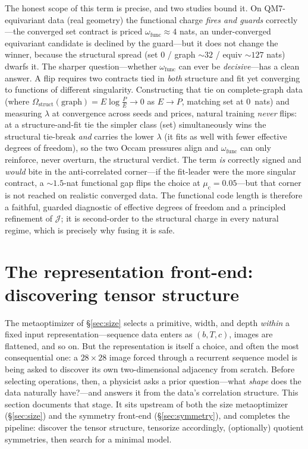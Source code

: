\documentclass[11pt]{article}
\begin{document}
The honest scope of this term is precise, and two studies bound it. On QM7-equivariant data (real geometry)
the functional charge \emph{fires and guards} correctly---the converged set contract is priced
$\omega_{\mathrm{func}}\approx 4$ nats, an under-converged equivariant candidate is declined by the
guard---but it does not change the winner, because the structural spread (set $0$ / graph ${\sim}32$ /
equiv ${\sim}127$ nats) dwarfs it. The sharper question---whether $\omega_{\mathrm{func}}$ can ever be
\emph{decisive}---has a clean answer. A flip requires two contracts tied in \emph{both} structure and fit
yet converging to functions of different singularity. Constructing that tie on complete-graph data (where
$\Omega_{\mathrm{struct}}(\text{graph})=E\log\tfrac{P}{E}\to0$ as $E\to P$, matching set at $0$~nats) and
measuring $\lambda$ at convergence across seeds and prices, natural training \emph{never} flips: at a
structure-and-fit tie the simpler class (set) simultaneously wins the structural tie-break \emph{and}
carries the lower $\lambda$ (it fits as well with fewer effective degrees of freedom), so the two Occam
pressures align and $\omega_{\mathrm{func}}$ can only reinforce, never overturn, the structural verdict.
The term \emph{is} correctly signed and \emph{would} bite in the anti-correlated corner---if the
fit-leader were the more singular contract, a ${\sim}1.5$-nat functional gap flips the choice at
$\mu_{\mathrm c}{=}0.05$---but that corner is not reached on realistic converged data. The functional code
length is therefore a faithful, guarded diagnostic of effective degrees of freedom and a principled
refinement of $\mathcal J$; it is second-order to the structural charge in every natural regime, which is
precisely why fusing it is safe.


\section{The representation front-end: discovering tensor structure}
\label{sec:representation}

The metaoptimizer of \S\ref{sec:size} selects a primitive, width, and depth \emph{within} a fixed
input representation---sequence data enters as $(b, T, c)$, images are flattened, and so on. But the
representation is itself a choice, and often the most consequential one: a $28\times28$ image forced
through a recurrent sequence model is being asked to discover its own two-dimensional adjacency from
scratch. Before selecting operations, then, a physicist asks a prior question---what \emph{shape}
does the data naturally have?---and answers it from the data's correlation structure. This section
documents that stage. It sits upstream of both the size metaoptimizer (\S\ref{sec:size}) and the
symmetry front-end (\S\ref{sec:symmetry}), and completes the pipeline: discover the tensor
structure, tensorize accordingly, (optionally) quotient symmetries, then search for a minimal model.
\end{document}
